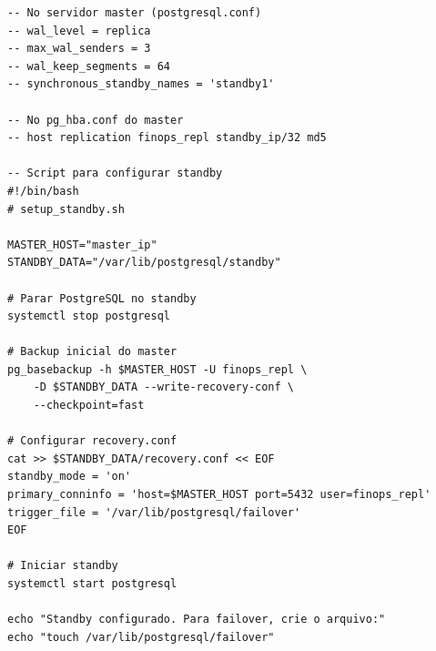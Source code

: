 \begin{lstlisting}[caption=Configuracao de replica]
-- No servidor master (postgresql.conf)
-- wal_level = replica
-- max_wal_senders = 3
-- wal_keep_segments = 64
-- synchronous_standby_names = 'standby1'

-- No pg_hba.conf do master
-- host replication finops_repl standby_ip/32 md5

-- Script para configurar standby
#!/bin/bash
# setup_standby.sh

MASTER_HOST="master_ip"
STANDBY_DATA="/var/lib/postgresql/standby"

# Parar PostgreSQL no standby
systemctl stop postgresql

# Backup inicial do master
pg_basebackup -h $MASTER_HOST -U finops_repl \
    -D $STANDBY_DATA --write-recovery-conf \
    --checkpoint=fast

# Configurar recovery.conf
cat >> $STANDBY_DATA/recovery.conf << EOF
standby_mode = 'on'
primary_conninfo = 'host=$MASTER_HOST port=5432 user=finops_repl'
trigger_file = '/var/lib/postgresql/failover'
EOF

# Iniciar standby
systemctl start postgresql

echo "Standby configurado. Para failover, crie o arquivo:"
echo "touch /var/lib/postgresql/failover"
\end{lstlisting}
